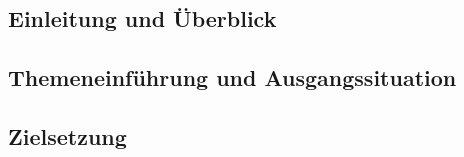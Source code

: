 \begin{onehalfspace}
	
\chapter{Einleitung und Überblick}


\section{Themeneinführung und Ausgangssituation}


\section{Zielsetzung}



\end{onehalfspace}